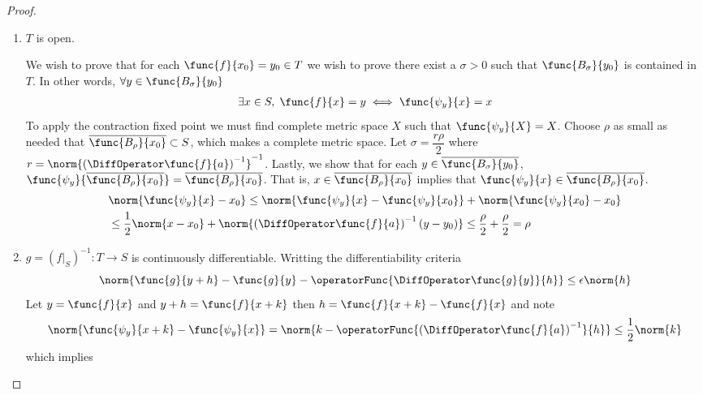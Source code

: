 \begin{proof}
\begin{enumerate}
        \item  \(T\) is open.

              We wish to prove that for each \(\func{f}{x_0} = y_0 \in T\) we wish to prove there exist a \( \sigma > 0\) such that \(\func{B_\sigma}{y_0}\) is contained in \(T\). In other words, \(\forall y \in \func{B_\sigma}{y_0}\)
              \begin{align*}
                  \exists x \in S, \; \func{f}{x} = y \iff \func{\psi_y}{x} = x
              \end{align*}
              To apply the contraction fixed point we must find complete metric space \(X\) such that \(\func{\psi_y}{X} = X\). Choose \(\rho\) as small as needed that \(\overline{\func{B_\rho}{x_0}} \subset S\), which makes a complete metric space. Let \(\sigma =  \dfrac{r \rho}{2}\) where \(r = \norm{\left(\DiffOperator \func{f}{a}\right)^{-1}}^{-1}\). Lastly, we show that for each \(y \in \overline{\func{B_\sigma}{y_0}}\), \(\func{\psi_y}{ \overline{\func{B_\rho}{x_0}} }=  \overline{\func{B_\rho}{x_0}}\). That is, \(x \in \overline{\func{B_\rho}{x_0}}\) implies that \( \func{\psi_y}{x} \in \overline{\func{B_\rho}{x_0}}\).
              \begin{align*}
                   & \norm{\func{\psi_y}{x}  - x_0} \leq \norm{\func{\psi_y}{x} - \func{\psi_y}{x_0}} + \norm{\func{\psi_y}{x_0} - x_0}                              \\
                   & \leq  \dfrac{1}{2} \norm{x - x_0} +  \norm{\left(\DiffOperator \func{f}{a}\right)^{-1}(y - y_0)}  \leq \dfrac{\rho}{2} + \dfrac{\rho}{2} = \rho
              \end{align*}
        \item \(g = (f|_S)^{-1} : T \to S\) is continuously differentiable. Writting the differentiability criteria
              \begin{equation*}
                  \norm{\func{g}{y + h} - \func{g}{y} - \operatorFunc{\DiffOperator \func{g}{y}}{h}} \leq \epsilon \norm{h}
              \end{equation*}
              Let \(y = \func{f}{x}\) and \(y + h = \func{f}{x + k}\) then \(h = \func{f}{x + k} - \func{f}{x}\) and note
              \begin{equation*}
                  \norm{\func{\psi_y}{x + k} - \func{\psi_y}{x}} = \norm{k - \operatorFunc{\left(\DiffOperator \func{f}{a}\right)^{-1}}{h}} \leq \dfrac{1}{2} \norm{k}
              \end{equation*}
              which implies
              \begin{equation*}

\end{equation*}
\end{enumerate}
\end{proof}
